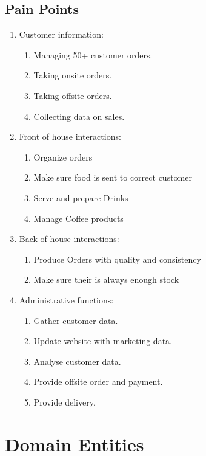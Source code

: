 \documentclass{article}
\begin{document}
\subsection{Pain Points}
\begin{enumerate}
    \item Customer information:
    \begin{enumerate}
        \item Managing 50+ customer orders.
        \item Taking onsite orders.
        \item Taking offsite orders.
        \item Collecting data on sales.
        \end{enumerate}
    \item Front of house interactions:
    \begin{enumerate}
        \item Organize orders
        \item Make sure food is sent to correct customer
        \item Serve and prepare Drinks
        \item Manage Coffee products 
    \end{enumerate}
    \item Back of house interactions:
    \begin{enumerate}
        \item Produce Orders with quality and consistency
        \item Make sure their is always enough stock
    \end{enumerate}
    \item Administrative functions:
    \begin{enumerate}
        \item Gather customer data.
        \item Update website with marketing data.
        \item Analyse customer data.
        \item Provide offsite order and payment.
        \item Provide delivery.
    \end{enumerate}
\end{enumerate}

\section{Domain Entities}
\end{document}
